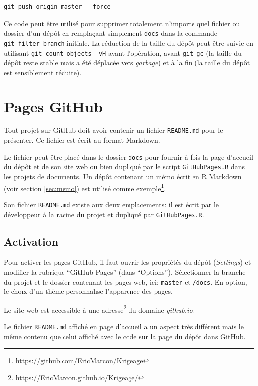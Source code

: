 \documentclass[
  11pt,
  french,
  a4paper,
  extrafontsizes,onecolumn,openright
  ]{memoir}
\begin{document}
\begin{verbatim}
git push origin master --force
\end{verbatim}

Ce code peut être utilisé pour supprimer totalement n'importe quel fichier ou dossier d'un dépôt en remplaçant simplement \texttt{docs} dans la commande \texttt{git\ filter-branch} initiale.
La réduction de la taille du dépôt peut être suivie en utilisant \texttt{git\ count-objects\ -vH} avant l'opération, avant \texttt{git\ gc} (la taille du dépôt reste stable mais a été déplacée vers \emph{garbage}) et à la fin (la taille du dépôt est sensiblement réduite).

\hypertarget{sec:github-pages}{%
\section{Pages GitHub}\label{sec:github-pages}}

Tout projet sur GitHub doit avoir contenir un fichier \texttt{README.md} pour le présenter.
Ce fichier est écrit au format Markdown.

Le fichier peut être placé dans le dossier \texttt{docs} pour fournir à fois la page d'accueil du dépôt et de son site web ou bien dupliqué par le script \texttt{GitHubPages.R} dans les projets de documents.
Un dépôt contenant un mémo écrit en R Markdown (voir section \ref{sec:memo}) est utilisé comme exemple\footnote{\url{https://github.com/EricMarcon/Krigeage}}.

Son fichier \texttt{README.md} existe aux deux emplacements: il est écrit par le développeur à la racine du projet et dupliqué par \texttt{GitHubPages.R}.

\hypertarget{activation}{%
\subsection{Activation}\label{activation}}

Pour activer les pages GitHub, il faut ouvrir les propriétés du dépôt (\emph{Settings}) et modifier la rubrique ``GitHub Pages'' (dans ``Options'').
Sélectionner la branche du projet et le dossier contenant les pages web, ici: \texttt{master} et \texttt{/docs}.
En option, le choix d'un thème personnalise l'apparence des pages.

Le site web est accessible à une adresse\footnote{\url{https://EricMarcon.github.io/Krigeage/}} du domaine \emph{github.io}.

Le fichier \texttt{README.md} affiché en page d'accueil a un aspect très différent mais le même contenu que celui affiché avec le code sur la page du dépôt dans GitHub.
\end{document}
